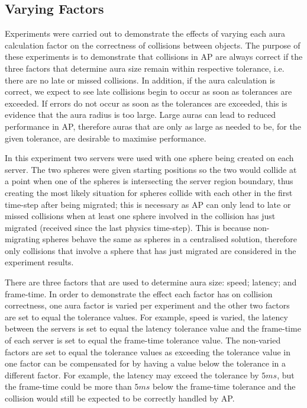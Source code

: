 \subsection{Varying Factors}
Experiments were carried out to demonstrate the effects of varying each aura calculation factor on the correctness of collisions between objects. The purpose of these experiments is to demonstrate that collisions in AP are always correct if the three factors that determine aura size remain within respective tolerance, i.e. there are no late or missed collisions. In addition, if the aura calculation is correct, we expect to see late collisions begin to occur as soon as tolerances are exceeded. If errors do not occur as soon as the tolerances are exceeded, this is evidence that the aura radius is too large. Large auras can lead to reduced performance in AP, therefore auras that are only as large as needed to be, for the given tolerance, are desirable to maximise performance.

In this experiment two servers were used with one sphere being created on each server. The two spheres were given starting positions so the two would collide at a point when one of the spheres is intersecting the server region boundary, thus creating the most likely situation for spheres collide with each other in the first time-step after being migrated; this is necessary as AP can only lead to late or missed collisions when at least one sphere involved in the collision has just migrated (received since the last physics time-step). This is because non-migrating spheres behave the same as spheres in a centralised solution, therefore only collisions that involve a sphere that has just migrated are considered in the experiment results.

There are three factors that are used to determine aura size: speed; latency; and frame-time. In order to demonstrate the effect each factor has on collision correctness, one aura factor is varied per experiment and the other two factors are set to equal the tolerance values. For example, speed is varied, the latency between the servers is set to equal the latency tolerance value and the frame-time of each server is set to equal the frame-time tolerance value. The non-varied factors are set to equal the tolerance values as exceeding the tolerance value in one factor can be compensated for by having a value below the tolerance in a different factor. For example, the latency may exceed the tolerance by $5ms$, but the frame-time could be more than $5ms$ below the frame-time tolerance and the collision would still be expected to be correctly handled by AP.

